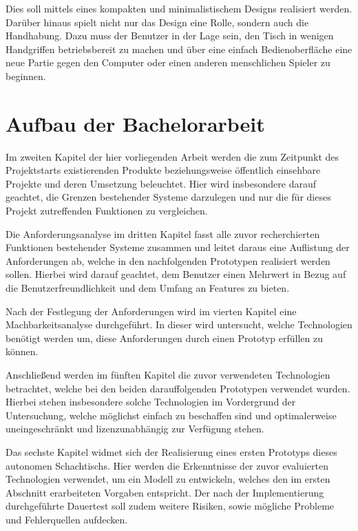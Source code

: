 Dies soll mittels eines kompakten und minimalistischem Designs
realisiert werden. Darüber hinaus spielt nicht nur das Design eine
Rolle, sondern auch die Handhabung. Dazu muss der Benutzer in der Lage
sein, den Tisch in wenigen Handgriffen betriebsbereit zu machen und über
eine einfach Bedienoberfläche eine neue Partie gegen den Computer oder
einen anderen menschlichen Spieler zu beginnen.

\hypertarget{aufbau-der-bachelorarbeit}{%
\section{Aufbau der Bachelorarbeit}\label{aufbau-der-bachelorarbeit}}

Im zweiten Kapitel der hier vorliegenden Arbeit werden die zum Zeitpunkt
des Projektstarts existierenden Produkte beziehungsweise öffentlich
einsehbare Projekte und deren Umsetzung beleuchtet. Hier wird
insbesondere darauf geachtet, die Grenzen bestehender Systeme darzulegen
und nur die für dieses Projekt zutreffenden Funktionen zu vergleichen.

Die Anforderungsanalyse im dritten Kapitel fasst alle zuvor
recherchierten Funktionen bestehender Systeme zusammen und leitet daraus
eine Auflistung der Anforderungen ab, welche in den nachfolgenden
Prototypen realisiert werden sollen. Hierbei wird darauf geachtet, dem
Benutzer einen Mehrwert in Bezug auf die Benutzerfreundlichkeit und dem
Umfang an Features zu bieten.

Nach der Festlegung der Anforderungen wird im vierten Kapitel eine
Machbarkeitsanalyse durchgeführt. In dieser wird untersucht, welche
Technologien benötigt werden um, diese Anforderungen durch einen
Prototyp erfüllen zu können.

Anschließend werden im fünften Kapitel die zuvor verwendeten
Technologien betrachtet, welche bei den beiden darauffolgenden
Prototypen verwendet wurden. Hierbei stehen insbesondere solche
Technologien im Vordergrund der Untersuchung, welche möglichst einfach
zu beschaffen sind und optimalerweise uneingeschränkt und
lizenzunabhängig zur Verfügung stehen.

Das sechste Kapitel widmet sich der Realisierung eines ersten Prototyps
dieses autonomen Schachtischs. Hier werden die Erkenntnisse der zuvor
evaluierten Technologien verwendet, um ein Modell zu entwickeln, welches
den im ersten Abschnitt erarbeiteten Vorgaben entspricht. Der nach der
Implementierung durchgeführte Dauertest soll zudem weitere Risiken,
sowie mögliche Probleme und Fehlerquellen aufdecken.

